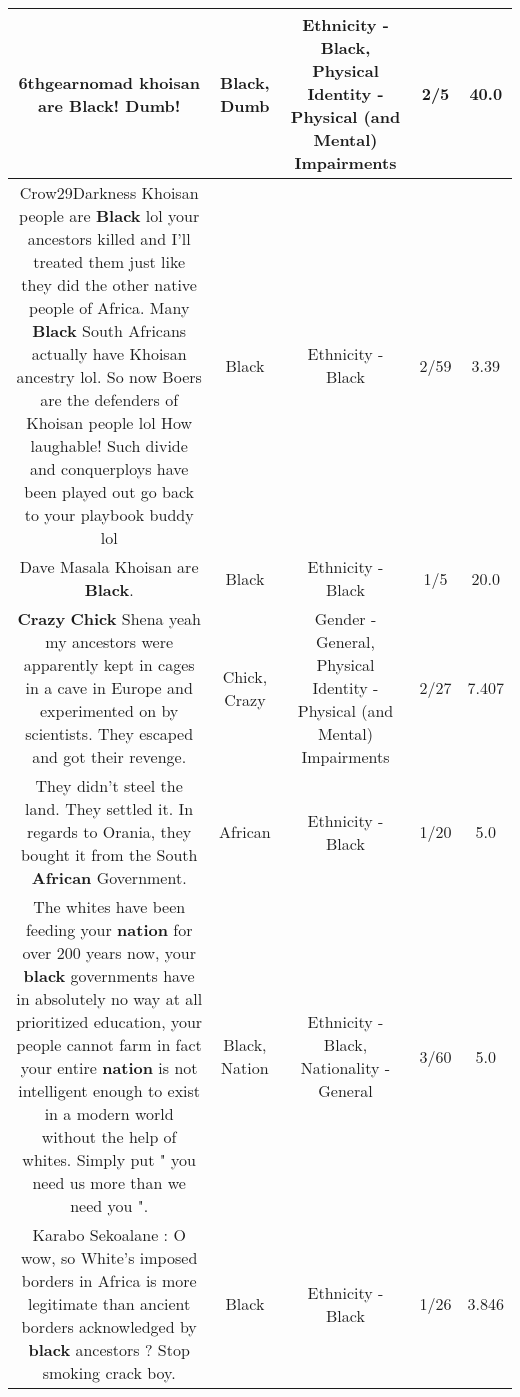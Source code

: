 \documentclass[11pt]{article}
\newlength\mylength
\begin{document}
\begin{center}
\begin{longtable}{|C{.65\mylength}|C{.30\mylength}|C{.12\mylength}|C{.12\mylength}|C{.12\mylength}|}
  \small \@6thgearnomad khoisan are \textbf{Black}! \textbf{Dumb}!\normalsize   & Black, Dumb & Ethnicity - Black, Physical Identity - Physical (and Mental) Impairments & 2/5 & 40.0 \\  \hline
  \small Crow29Darkness Khoisan people are \textbf{Black} lol your ancestors killed and I'll treated them just like they did the other native people of Africa. Many \textbf{Black} South Africans actually have Khoisan ancestry lol. So now Boers are the defenders of Khoisan people lol How laughable! Such divide and conquerploys have been played out go back to your playbook buddy lol\normalsize   & Black & Ethnicity - Black & 2/59 & 3.39 \\  \hline
  \small Dave Masala Khoisan are \textbf{Black}.\normalsize   & Black & Ethnicity - Black & 1/5 & 20.0 \\  \hline
  \small \@\textbf{Crazy} \textbf{Chick} Shena yeah my ancestors were apparently kept in cages in a cave in Europe and experimented on by scientists. They escaped and got their revenge.\normalsize   & Chick, Crazy & Gender - General, Physical Identity - Physical (and Mental) Impairments & 2/27 & 7.407 \\  \hline
  \small They didn't steel the land. They settled it. In regards to Orania, they bought it from the South \textbf{African} Government.\normalsize   & African & Ethnicity - Black & 1/20 & 5.0 \\  \hline
  \small The whites have been feeding your \textbf{nation} for over 200 years now, your \textbf{black} governments have in absolutely no way at all prioritized education, your people cannot farm in fact your entire \textbf{nation} is not intelligent enough to exist in a modern world without the help of whites. Simply put " you need us more than we need you ".\normalsize   & Black, Nation & Ethnicity - Black, Nationality - General & 3/60 & 5.0 \\  \hline
  \small Karabo Sekoalane : O wow, so White's imposed borders in Africa is more legitimate than ancient borders acknowledged by \textbf{black} ancestors ? Stop smoking crack boy.\normalsize   & Black & Ethnicity - Black & 1/26 & 3.846 \\  \hline

\end{longtable}
\end{center}
\end{document}
